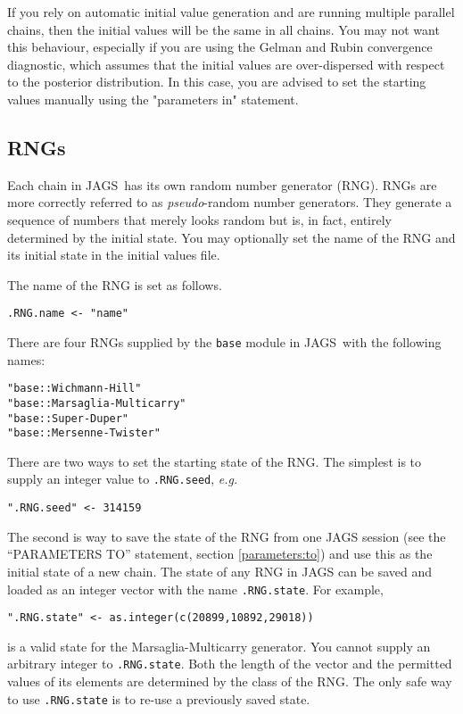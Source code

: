 \documentclass[11pt, a4paper, titlepage]{report}
\newcommand{\JAGS}{\textsf{JAGS}}
\begin{document}
If you rely on automatic initial value generation and are running
multiple parallel chains, then the initial values will be the same in
all chains.  You may not want this behaviour, especially if you are
using the Gelman and Rubin convergence diagnostic, which assumes that
the initial values are over-dispersed with respect to the posterior
distribution. In this case, you are advised to set the starting values
manually using the "parameters in" statement.

\subsection{RNGs}
\label{section:rngs}

Each chain in \JAGS\ has its own random number generator (RNG). RNGs
are more correctly referred to as {\em pseudo}-random number
generators. They generate a sequence of numbers that merely looks
random but is, in fact, entirely determined by the initial state.  You
may optionally set the name of the RNG and its initial state in the
initial values file.

The name of the RNG is set as follows. 
\begin{verbatim}
.RNG.name <- "name"
\end{verbatim}
There are four RNGs supplied by the \texttt{base} module in \JAGS\
with the following names:
\begin{verbatim}
"base::Wichmann-Hill"
"base::Marsaglia-Multicarry"
"base::Super-Duper"
"base::Mersenne-Twister"
\end{verbatim}

There are two ways to set the starting state of the RNG. The simplest
is to supply an integer value to \texttt{.RNG.seed}, {\em e.g.}
\begin{verbatim}
".RNG.seed" <- 314159
\end{verbatim}
The second is way to save the state of the RNG from one JAGS session
(see the ``PARAMETERS TO'' statement, section \ref{parameters:to}) and
use this as the initial state of a new chain. The state of any RNG in
JAGS can be saved and loaded as an integer vector with the name
\texttt{.RNG.state}. For example,
\begin{verbatim}
".RNG.state" <- as.integer(c(20899,10892,29018))
\end{verbatim}
is a valid state for the Marsaglia-Multicarry generator.  You cannot
supply an arbitrary integer to \texttt{.RNG.state}. Both the length of
the vector and the permitted values of its elements are determined by
the class of the RNG. The only safe way to use \texttt{.RNG.state} is
to re-use a previously saved state.
\end{document}
